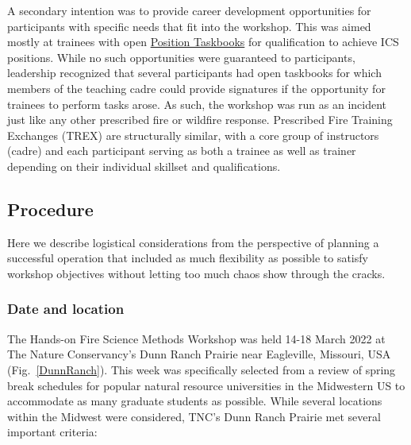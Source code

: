 \documentclass[fire,article,submit,moreauthors,pdftex]{Definitions/mdpi}
\begin{document}
A secondary intention was to provide career development opportunities for participants with specific needs that fit into the workshop.
This was aimed mostly at trainees with open \href{https://www.nwcg.gov/publications/position-taskbooks/about}{Position Taskbooks} for qualification to achieve ICS positions.
While no such opportunities were guaranteed to participants, leadership recognized that several participants had open taskbooks for which members of the teaching cadre could provide signatures if the opportunity for trainees to perform tasks arose.
As such, the workshop was run as an incident just like any other prescribed fire or wildfire response. 
Prescribed Fire Training Exchanges (TREX) are structurally similar, with a core group of instructors (cadre) and each participant serving as both a trainee as well as trainer depending on their individual skillset and qualifications.   

\subsection{Procedure}

Here we describe logistical considerations from the perspective of planning a successful operation that included as much flexibility as possible to satisfy workshop objectives without letting too much chaos show through the cracks.

\subsubsection{Date and location}

The Hands-on Fire Science Methods Workshop was held 14-18 March 2022 at The Nature Conservancy's Dunn Ranch Prairie near Eagleville, Missouri, USA (Fig.~\ref{DunnRanch}).
This week was specifically selected from a review of spring break schedules for popular natural resource universities in the Midwestern US to accommodate as many graduate students as possible.
While several locations within the Midwest were considered, TNC's Dunn Ranch Prairie met several important criteria:
\end{document}
